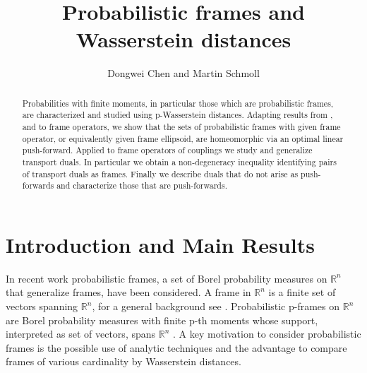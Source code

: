 \documentclass{amsart}
\numberwithin{equation}{section}
\newcommand\R{{\mathbb R}}
\theoremstyle{plain}
\theoremstyle{definition}
\begin{document}

\title{Probabilistic frames and Wasserstein distances}

\author{Dongwei Chen and Martin Schmoll}
\address{Department of Mathematics, Colorado State University, CO, US, 80523}
\address{School of Mathematical and Statistical Sciences, Clemson University, SC, US.}
\begin{abstract}
Probabilities with finite moments, in particular those which are probabilistic frames, are characterized and studied using p-Wasserstein distances.  
Adapting results from \cite{cuesta1996lower}, \cite{Gelbrich90} and \cite{olkin1982distance} to frame operators, 
we show that the sets of probabilistic frames with given frame operator, or equivalently given frame ellipsoid, 
are homeomorphic via an optimal linear push-forward. Applied to frame operators of couplings we study and generalize transport duals. 
In particular we obtain a non-degeneracy inequality identifying pairs of transport duals as frames. Finally we describe duals  
that do not arise as push-forwards and characterize those that are push-forwards.  
\end{abstract}



\maketitle
\section{Introduction and Main Results}
In recent work \cite{ehler2013probabilistic, loukili2020minimization, maslouhi2019probabilistic, wickman2023gradient} probabilistic frames, a set of Borel probability measures on $\R^n$ that generalize frames, have been considered. A frame in $\R^n$ is a finite set of vectors spanning $\R^n$, for a general background see \cite{christensen}. 
Probabilistic p-frames on $\R^n$ are Borel probability measures with finite p-th moments whose support, interpreted as set of vectors, spans $\R^n$  \cite{ehler2013probabilistic}. A key motivation to consider probabilistic frames is the possible use of analytic techniques and the advantage to compare frames of various cardinality by Wasserstein distances.  
\end{document}

